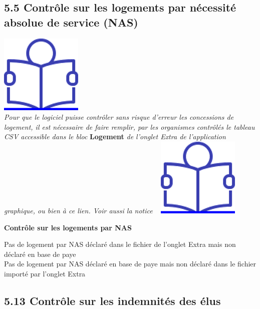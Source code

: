 \hypertarget{controle-sur-les-logements-par-necessite-absolue-de-service-nas}{%
\subsection{5.5 Contrôle sur les logements par nécessité absolue de
service
(NAS)}\label{controle-sur-les-logements-par-necessite-absolue-de-service-nas}}

\href{../Docs/Notices/fiche_NAS.odt}{\includegraphics{icones/Notice.png}}\\
\emph{Pour que le logiciel puisse contrôler sans risque d'erreur les
concessions de logement, il est nécessaire de faire remplir, par les
organismes contrôlés le tableau CSV accessible dans le bloc}
\textbf{Logement} \emph{de l'onglet Extra de l'application graphique, ou
bien à ce lien. Voir aussi la notice} ~
\href{../Docs/Notices/fiche_tableau_logements.odt}{\includegraphics{icones/Notice.png}}

\textbf{Contrôle sur les logements par NAS}

Pas de logement par NAS déclaré dans le fichier de l'onglet Extra mais
non déclaré en base de paye\\
Pas de logement par NAS déclaré en base de paye mais non déclaré dans le
fichier importé par l'onglet Extra

\hypertarget{controle-sur-les-indemnites-des-elus}{%
\subsection{5.13 Contrôle sur les indemnités des
élus}\label{controle-sur-les-indemnites-des-elus}}


